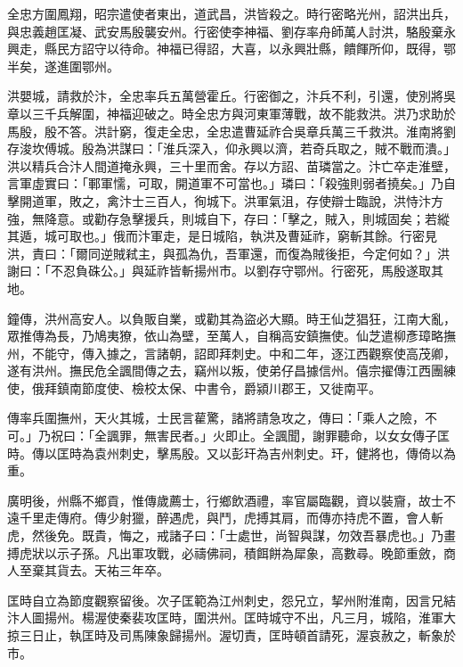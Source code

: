 \begin{pinyinscope}
 全忠方圍鳳翔，昭宗遣使者東出，道武昌，洪皆殺之。時行密略光州，詔洪出兵，與忠義趙匡凝、武安馬殷襲安州。行密使李神福、劉存率舟師萬人討洪，駱殷棄永興走，縣民方詔守以待命。神福已得詔，大喜，以永興壯縣，饋餫所仰，既得，鄂半矣，遂進圍鄂州。



 洪嬰城，請救於汴，全忠率兵五萬營霍丘。行密御之，汴兵不利，引還，使別將吳章以三千兵解圍，神福迎破之。時全忠方與河東軍薄戰，故不能救洪。洪乃求助於馬殷，殷不答。洪計窮，復走全忠，全忠遣曹延祚合吳章兵萬三千救洪。淮南將劉存浚坎傅城。殷為洪謀曰：「淮兵深入，仰永興以濟，若奇兵取之，賊不戰而潰。」洪以精兵合汴人間道掩永興，三十里而舍。存以方詔、苗璘當之。汴亡卒走淮壁，言軍虛實曰：「鄆軍懦，可取，開道軍不可當也。」璘曰：「殺強則弱者撓矣。」乃自擊開道軍，敗之，禽汴士三百人，徇城下。洪軍氣沮，存使辯士臨說，洪恃汴方強，無降意。或勸存急擊援兵，則城自下，存曰：「擊之，賊入，則城固矣；若縱其遁，城可取也。」俄而汴軍走，是日城陷，執洪及曹延祚，窮斬其餘。行密見洪，責曰：「爾同逆賊弒主，與孤為仇，吾軍還，而復為賊後拒，今定何如？」洪謝曰：「不忍負硃公。」與延祚皆斬揚州市。以劉存守鄂州。行密死，馬殷遂取其地。



 鐘傳，洪州高安人。以負販自業，或勸其為盜必大顯。時王仙芝猖狂，江南大亂，眾推傳為長，乃鳩夷獠，依山為壁，至萬人，自稱高安鎮撫使。仙芝遣柳彥璋略撫州，不能守，傳入據之，言諸朝，詔即拜刺史。中和二年，逐江西觀察使高茂卿，遂有洪州。撫民危全諷間傳之去，竊州以叛，使弟仔昌據信州。僖宗擢傳江西團練使，俄拜鎮南節度使、檢校太保、中書令，爵潁川郡王，又徙南平。



 傳率兵圍撫州，天火其城，士民言雚驚，諸將請急攻之，傳曰：「乘人之險，不可。」乃祝曰：「全諷罪，無害民者。」火即止。全諷聞，謝罪聽命，以女女傳子匡時。傳以匡時為袁州刺史，擊馬殷。又以彭玕為吉州刺史。玕，健將也，傳倚以為重。



 廣明後，州縣不鄉貢，惟傳歲薦士，行鄉飲酒禮，率官屬臨觀，資以裝齎，故士不遠千里走傳府。傳少射獵，醉遇虎，與鬥，虎搏其肩，而傳亦持虎不置，會人斬虎，然後免。既貴，悔之，戒諸子曰：「士處世，尚智與謀，勿效吾暴虎也。」乃畫搏虎狀以示子孫。凡出軍攻戰，必禱佛祠，積餌餅為犀象，高數尋。晚節重斂，商人至棄其貨去。天祐三年卒。



 匡時自立為節度觀察留後。次子匡範為江州刺史，怨兄立，挈州附淮南，因言兄結汴人圖揚州。楊渥使秦裴攻匡時，圍洪州。匡時城守不出，凡三月，城陷，淮軍大掠三日止，執匡時及司馬陳象歸揚州。渥切責，匡時頓首請死，渥哀赦之，斬象於市。




\end{pinyinscope}
